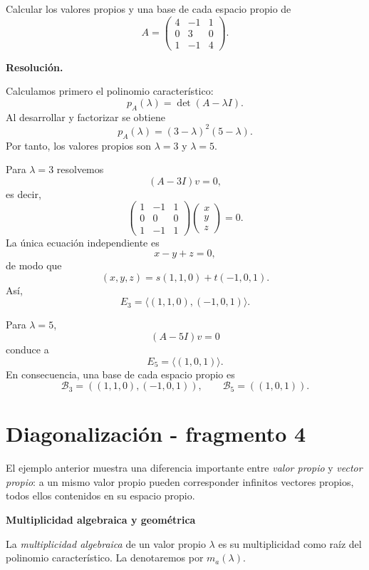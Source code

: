 \begin{solvedexercise}
Calcular los valores propios y una base de cada espacio propio de
\[
A=\begin{pmatrix}
4&-1&1\\
0&3&0\\
1&-1&4
\end{pmatrix}.
\]

\textbf{Resolución.}\par\smallskip
Calculamos primero el polinomio característico:
\[
p_A(\lambda)=\det(A-\lambda I).
\]
Al desarrollar y factorizar se obtiene
\[
p_A(\lambda)=(3-\lambda)^2(5-\lambda).
\]
Por tanto, los valores propios son $\lambda=3$ y $\lambda=5$.

Para $\lambda=3$ resolvemos
\[
(A-3I)v=0,
\]
es decir,
\[
\begin{pmatrix}
1&-1&1\\
0&0&0\\
1&-1&1
\end{pmatrix}
\begin{pmatrix}x\\y\\z\end{pmatrix}=0.
\]
La única ecuación independiente es
\[
x-y+z=0,
\]
de modo que
\[
(x,y,z)=s(1,1,0)+t(-1,0,1).
\]
Así,
\[
E_3=\langle(1,1,0),(-1,0,1)\rangle.
\]

Para $\lambda=5$,
\[
(A-5I)v=0
\]
conduce a
\[
E_5=\langle(1,0,1)\rangle.
\]
En consecuencia, una base de cada espacio propio es
\[
\boxed{\mathcal B_3=((1,1,0),(-1,0,1)),\qquad
\mathcal B_5=((1,0,1)).}
\]
\end{solvedexercise}


\section{Diagonalización - fragmento 4}
El ejemplo anterior muestra una diferencia importante entre \emph{valor propio} y \emph{vector propio}: a un mismo valor propio pueden corresponder infinitos vectores propios, todos ellos contenidos en su espacio propio.

\textbf{Multiplicidad algebraica y geométrica}

\begin{definition}
La \emph{multiplicidad algebraica} de un valor propio $\lambda$ es su multiplicidad como raíz del polinomio característico. La denotaremos por $m_a(\lambda)$.
\end{definition}

